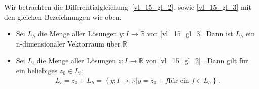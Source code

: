 \begin{Satz}{
	Wir betrachten die Differentialgleichung~\ref{vl_15_gl_2}, sowie \ref{vl_15_gl_3} mit den gleichen Bezeichnungen wie oben. 
	\begin{itemize}
		\item Sei $L_h$ die Menge aller Lösungen $y: I \rightarrow \mathbb{R}$ 
		von \ref{vl_15_gl_3}. Dann ist $L_h$ ein n-dimensionaler Vektorraum über 
		$\mathbb{R}$
		\item Sei $L_i$ die Menge aller Lösungen $z: I \rightarrow \mathbb{R}$ 
		von \ref{vl_15_gl_2} . 
		Dann gilt für ein beliebiges $z_0 \in L_i$:
		\begin{align*}
		L_i = z_0 + L_h
		= \left\{ y : I \rightarrow \mathbb{R} \vert y = z_0 + f 
		\text{für ein } f \in L_h\right\}.
	\end{align*}			
	\end{itemize}
}\end{Satz}